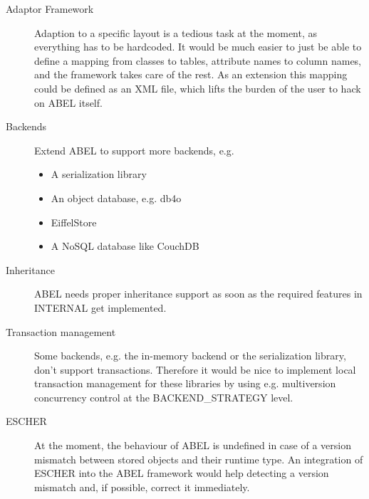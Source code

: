 \begin{description}
 \item [Adaptor Framework] Adaption to a specific layout is a tedious task at the moment, as everything has to be hardcoded. 
It would be much easier to just be able to define a mapping from classes to tables, attribute names to column names, and the framework takes care of the rest.
As an extension this mapping could be defined as an XML file, which lifts the burden of the user to hack on ABEL itself.
\item [Backends] Extend ABEL to support more backends, e.g.
\begin{itemize}
 \item A serialization library
 \item An object database, e.g. db4o
 \item EiffelStore
 \item A NoSQL database like CouchDB
\end{itemize}
 \item [Inheritance] ABEL needs proper inheritance support as soon as the required features in INTERNAL get implemented.
\item [Transaction management] Some backends, e.g. the in-memory backend or the serialization library, don't support transactions.
 Therefore it would be nice to implement local transaction management for these libraries by using e.g. multiversion concurrency control at the BACKEND\_STRATEGY level.
\item [ESCHER] At the moment, the behaviour of ABEL is undefined in case of a version mismatch between stored objects and their runtime type. 
An integration of ESCHER into the ABEL framework would help detecting a version mismatch and, if possible, correct it immediately.
\end{description}
